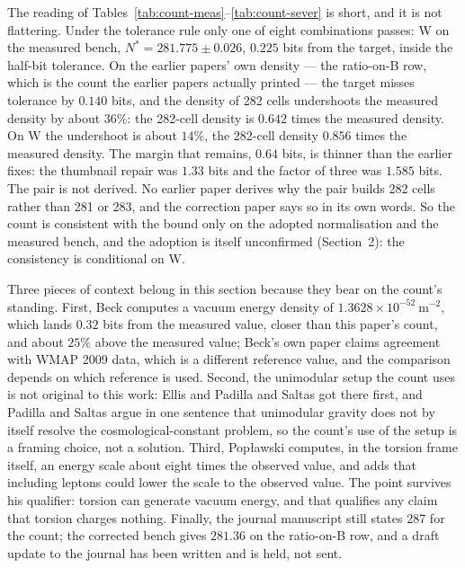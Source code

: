 \documentclass[11pt]{article}
\begin{document}
The reading of Tables~\ref{tab:count-meas}--\ref{tab:count-sever} is short, and it is not flattering. Under
the tolerance rule only one of eight combinations passes: W on the
measured bench, $N^* = 281.775 \pm 0.026$, $0.225$ bits from the target,
inside the half-bit tolerance. On the earlier papers' own density ---
the ratio-on-B row, which is the count the earlier papers actually
printed --- the target misses tolerance by $0.140$ bits, and the density
of 282 cells undershoots the measured density by about $36\%$: the
282-cell density is $0.642$ times the measured density. On W the
undershoot is about $14\%$, the 282-cell density $0.856$ times the
measured density. The margin that remains, $0.64$ bits, is thinner than
the earlier fixes: the thumbnail repair was $1.33$ bits and the factor
of three was $1.585$ bits. The pair is not derived. No earlier paper
derives why the pair builds 282 cells rather than 281 or 283, and the
correction paper says so in its own words. So the count is consistent
with the bound only on the adopted normalisation and the measured bench,
and the adoption is itself unconfirmed (Section~2): the consistency is
conditional on W.

Three pieces of context belong in this section because they bear on the
count's standing. First, Beck \cite{Beck09} computes a vacuum energy
density of $1.3628\times10^{-52}\ \mathrm{m^{-2}}$, which lands $0.32$
bits from the measured value, closer than this paper's count, and about
$25\%$ above the measured value; Beck's own paper claims agreement
with WMAP 2009 data, which is a different reference value, and the
comparison depends on which reference is used. Second, the unimodular
setup the count uses is not original to this work: Ellis
\cite{Ellis11} and Padilla and Saltas \cite{Padilla15} got there first,
and Padilla and Saltas argue in one sentence that unimodular gravity
does not by itself resolve the cosmological-constant problem, so the
count's use of the setup is a framing choice, not a solution. Third,
Pop{\l}awski \cite{Poplawski11} computes, in the torsion frame itself,
an energy scale about eight times the observed value, and adds that
including leptons could lower the scale to the observed value. The
point survives his qualifier: torsion can generate vacuum energy, and
that qualifies any claim that torsion charges nothing. Finally, the
journal manuscript still states 287 for the count; the corrected bench
gives $281.36$ on the ratio-on-B row, and a draft update to the journal
has been written and is held, not sent.
\end{document}
